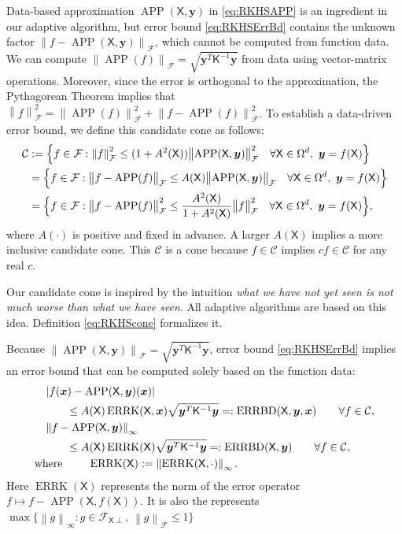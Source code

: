 \documentclass[]{mcom-l}
\theoremstyle{plain}
\theoremstyle{definition}
\DeclareMathOperator{\errK}{ERRK}
\DeclareMathOperator{\errBd}{ERRBD}
\DeclareMathOperator{\APP}{APP}
\newcommand{\mK}{\mathsf{K}}
\newcommand{\mX}{\mathsf{X}}
\newcommand{\bx}{{\boldsymbol{x}}}
\newcommand{\by}{{\boldsymbol{y}}}
\newcommand{\calc}{{\mathcal{C}}}
\newcommand{\calf}{{\mathcal{F}}}
\def\abs#1{\ensuremath{\left \lvert #1 \right \rvert}}
\newcommand{\norm}[2][{}]{\ensuremath{\left \lVert #2 \right \rVert}_{#1}}
\newcommand{\bignorm}[2][{}]{\ensuremath{\bigl \lVert #2 \bigr \rVert}_{#1}}
\begin{document}
Data-based approximation $\APP(\mX,\by)$ in \eqref{eq:RKHSAPP} is an ingredient in our adaptive algorithm, but error bound \eqref{eq:RKHSErrBd} contains the unknown factor $\norm[\calf]{f - \APP(\mX,\by)}$, which cannot be computed from function data.  We can compute  $\bignorm[\calf]{\APP(f)} = \sqrt{\by^T \mK^{-1} \by}$ from data using vector-matrix operations.  Moreover, since the error is orthogonal to the approximation,  the Pythagorean Theorem implies that $\norm[\calf]{f}^2  = \bignorm[\calf]{\APP(f)}^2 + \bignorm[\calf]{f - \APP(f)}^2$.  To establish a data-driven error bound, we define this candidate cone as follows:
\begin{align} \label{eq:RKHScone}
\calc &:= \Bigl\{f \in \calf : \norm[\calf]{f}^2 \le (1 + A^2(\mX)) \bignorm[\calf]{\APP(\mX,\by)}^2 \quad \forall \mX \in \Omega^d, \ \by = f(\mX) \Bigr \} \\
\nonumber
& = \Bigl \{f \in \calf : \bignorm[\calf]{f - \APP(f)} \le A(\mX) \bignorm[\calf]{\APP(\mX,\by)} \quad \forall \mX \in \Omega^d, \ \by = f(\mX) \Bigr \} \\
\nonumber
& = \Bigl \{f \in \calf : \bignorm[\calf]{f - \APP(f)}^2 \le \frac{A^2(\mX)}{1 + A^2(\mX)} \bignorm[\calf]{f}^2 \quad \forall \mX \in \Omega^d, \ \by = f(\mX) \Bigr \},
\end{align}
where $A(\cdot)$ is positive and fixed in advance.  A larger $A(\mX)$ implies a more inclusive candidate cone.  This $\calc$ is a cone because $f \in \calc$ implies $c f \in \calc$ for any real $c$. 

Our candidate cone is inspired by the intuition \emph{what we have not yet seen is not much worse than what we have seen}. All adaptive algorithms are based on this idea. Definition \eqref{eq:RKHScone} formalizes it. 

Because $\bignorm[\calf]{\APP(\mX,\by)} = \sqrt{\by^T \mK^{-1} \by}$, error bound \eqref{eq:RKHSErrBd} implies an error bound that can be computed solely based on the function data: 
\begin{subequations} \label{eq:DataErrBd}
\begin{align}
\label{eq:DataErrBdA}
    \MoveEqLeft\abs{f(\bx) - \APP(\mX,\by)(\bx)} \\
    \nonumber
    & \le   A(\mX) \errK(\mX,\bx) \sqrt{\by^T \mK^{-1} \by } =: \errBd(\mX,\by,\bx) \qquad \forall f \in \calc, \\
    \label{eq:DataErrBdB}
    \MoveEqLeft\norm[\infty]{f - \APP(\mX,\by)} \\ 
    \nonumber 
    & \le   A(\mX) \errK(\mX) \sqrt{\by^T \mK^{-1} \by } =: \errBd(\mX,\by) \qquad \forall f \in \calc, \\
    \text{where }& \qquad \errK(\mX) := \norm[\infty]{\errK(\mX,\cdot)}.
\end{align}
\end{subequations}
Here $\errK(\mX)$ represents the norm of the error operator $f \mapsto f-\APP(\mX,f(\mX))$.  It is also the represents $\max \{\norm[\infty]{g} : g \in \calf_{\mX \perp}, \ \norm[\calf]{g} \le 1\}$
\end{document}
